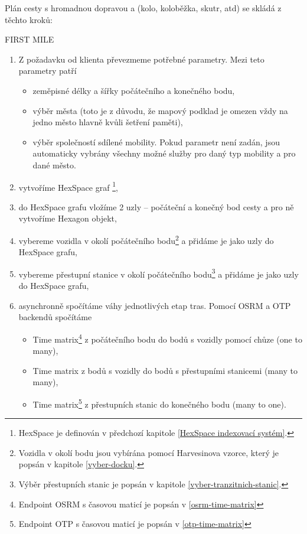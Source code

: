 \documentclass[thesis=M,czech]{FITthesis}[2019/12/23]
\theoremstyle{plain}
\theoremstyle{definition}
\begin{document}
Plán cesty s hromadnou dopravou a (kolo, koloběžka, skutr, atd) se skládá z těchto kroků:

FIRST MILE

\begin{enumerate}
	\item Z požadavku od klienta převezmeme potřebné parametry. Mezi teto parametry patří
	\begin{itemize}
		\item zeměpisné délky a šířky počátečního a konečného bodu,
		\item výběr města (toto je z důvodu, že mapový podklad je omezen vždy na jedno město hlavně kvůli šetření paměti),
		\item výběr společností sdílené mobility. Pokud parametr není zadán, jsou automaticky vybrány všechny možné služby pro daný typ mobility a pro dané město.
	\end{itemize}
	\item vytvoříme HexSpace graf \footnote{HexSpace je definován v předchozí kapitole \ref{HexSpace indexovací systém}.},
	\item do HexSpace grafu vložíme 2 uzly -- počáteční a konečný bod cesty a pro ně vytvoříme Hexagon objekt,
	\item vybereme vozidla v okolí počátečního bodu\footnote{Vozidla v okolí bodu jsou vybírána pomocí Harvesinova vzorce, který je popsán v kapitole \ref{vyber-docku}.} a přidáme je jako uzly do HexSpace grafu,
	\item vybereme přestupní stanice v okolí počátečního bodu\footnote{Výběr přestupních stanic je popsán v kapitole \ref{vyber-tranzitnich-stanic}.} a přidáme je jako uzly do HexSpace grafu, 
	\item asynchronně spočítáme váhy jednotlivých etap tras. Pomocí OSRM a OTP backendů spočítáme 
	\begin{itemize}
		\item Time matrix\footnote{Endpoint OSRM s časovou maticí je popsán v \ref{osrm-time-matrix}} z počátečního bodu do bodů s vozidly pomocí chůze (one to many),
		\item Time matrix z bodů s vozidly do bodů s přestupními stanicemi (many to many),
		\item Time matrix\footnote{Endpoint OTP s časovou maticí je popsán v \ref{otp-time-matrix}} z přestupních stanic do konečného bodu (many to one).


\end{itemize}
\end{enumerate}
\end{document}

